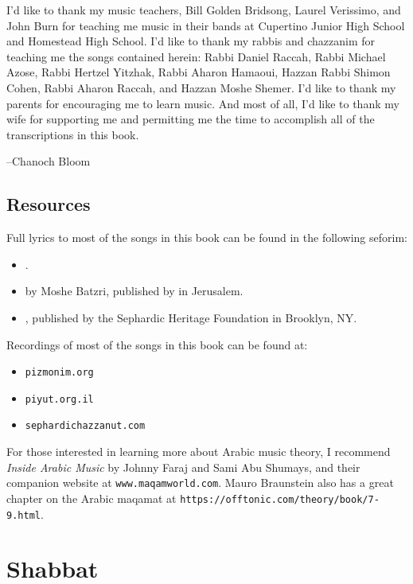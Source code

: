\documentclass[letterpaper]{memoir}
\newcommand{\song}[2]{}
\begin{document}
I'd like to thank my music teachers, Bill Golden Bridsong, Laurel 
Verissimo, and John Burn for teaching me music in their bands at 
Cupertino Junior High School and Homestead High School.
I'd like to thank my rabbis and 
chazzanim for teaching me the songs contained herein: Rabbi Daniel Raccah, Rabbi 
Michael Azose, Rabbi Hertzel Yitzhak, Rabbi Aharon Hamaoui, Hazzan Rabbi Shimon 
Cohen, Rabbi Aharon Raccah, and Hazzan Moshe Shemer. I'd like to thank my 
parents for encouraging me to learn music. And most of all, I'd like to thank my 
wife for supporting me and permitting me the time to accomplish all of the 
transcriptions in this book.

--Chanoch Bloom

\section*{Resources}

Full lyrics to most of the songs in this book can be found in the following seforim:

\begin{itemize}
\item {}.
\item {} by Moshe Batzri, published by  in Jerusalem.
\item {}, published by the Sephardic Heritage Foundation in Brooklyn, NY.
\end{itemize}

\noindent
Recordings of most of the songs in this book can be found at:

\begin{itemize}
\item \texttt{pizmonim.org}
\item \texttt{piyut.org.il}
\item \texttt{sephardichazzanut.com}
\end{itemize}

For those interested in learning more about
Arabic music theory, I recommend \textit{Inside Arabic Music} by Johnny 
Faraj and Sami Abu Shumays, and their companion website at \texttt{www.maqamworld.com}.
Mauro Braunstein also has a great chapter on the Arabic maqamat at 
\texttt{https://offtonic.com/theory/book/7-9.html}.




\chapter{Shabbat}
\song{Ashir La'el Asher Shavat}{Ashir_Lael_Asher_Shavat.pdf}
\end{document}
